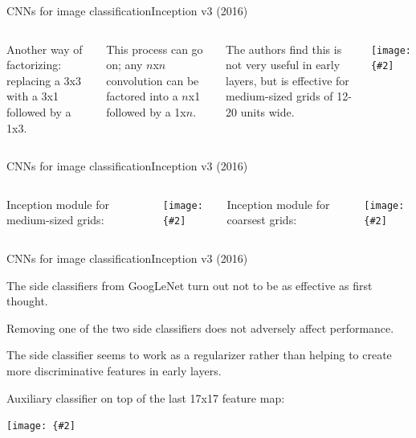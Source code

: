 \documentclass{beamer}
\newcommand{\myfig}[3]{\centerline{\texttt{[image: \{\#2]}}}
\begin{document}
\begin{frame}{CNNs for image classification}{Inception v3 (2016)}

  \begin{columns}

  \column{3in}
  
  Another way of factorizing:
  replacing a 3x3 with a 3x1 followed by a 1x3.

  \medskip

  This process can go on; any $n$x$n$ convolution can be
  factored into a $n$x1 followed by a 1x$n$.

  \medskip

  The authors find this is not very useful in early 
  layers, but is effective for medium-sized grids of 12-20
  units wide.

  \column{1.5in}

  \myfig{1.4in}{szegedy-15-fig3}{Szegedy et al. (2016), Figure 3}

  \end{columns}

\end{frame}


\begin{frame}{CNNs for image classification}{Inception v3 (2016)}

  \begin{columns}

  \column{2in}

  Inception module for medium-sized grids:

  \medskip

  \myfig{1.8in}{szegedy-15-fig6}{Szegedy et al. (2016), Figure 6}

  \column{2in}

  Inception module for coarsest grids:
	  
  \medskip

  \myfig{1.8in}{szegedy-15-fig7}{Szegedy et al. (2016), Figure 7}

  \end{columns}

\end{frame}


\begin{frame}{CNNs for image classification}{Inception v3 (2016)}

  The side classifiers from GoogLeNet turn out not to be as effective
  as first thought.

  \medskip

  Removing one of the two side classifiers does not adversely affect
  performance.

  \medskip

  The side classifier seems to work as a regularizer rather than
  helping to create more discriminative features in early layers.

  \medskip

  Auxiliary classifier on top of the last 17x17 feature map:

  \medskip

  \myfig{2in}{szegedy-15-fig8}{Szegedy et al. (2016), Figure 8}

\end{frame}
\end{document}
